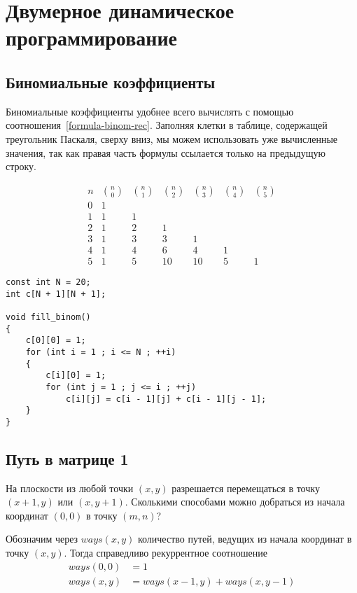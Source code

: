 \documentclass[14pt]{book}
\begin{document}
\section{Двумерное динамическое программирование}

\subsection{Биномиальные коэффициенты}

Биномиальные коэффициенты удобнее всего вычислять с помощью соотношения~\ref{formula-binom-rec}.
Заполняя клетки в таблице, содержащей треугольник Паскаля, сверху вниз, мы можем
использовать уже вычисленные значения, так как правая часть формулы ссылается только на
предыдущую строку.

$$
 \begin{array}{ccccccc}
 n & \binom{n}{0} & \binom{n}{1} & \binom{n}{2} & \binom{n}{3} & \binom{n}{4} & \binom{n}{5} \\
 0 & 1 \\
 1 & 1 & 1 \\
 2 &  1 & 2 & 1 \\
 3 & 1 & 3 & 3 & 1 \\
 4 & 1 & 4 & 6 & 4 & 1 \\
 5 & 1 & 5 & 10 & 10 & 5 & 1
 \end{array}
$$

\begin{lstlisting}
const int N = 20;
int c[N + 1][N + 1];

void fill_binom()
{
    c[0][0] = 1;
    for (int i = 1 ; i <= N ; ++i)
    {
        c[i][0] = 1;
        for (int j = 1 ; j <= i ; ++j)
            c[i][j] = c[i - 1][j] + c[i - 1][j - 1];
    }
}
\end{lstlisting}

\subsection{Путь в матрице 1}

На плоскости из любой точки $(x, y)$ разрешается перемещаться в точку $(x+1,y)$ или $(x,y+1)$.
Сколькими способами можно добраться из начала координат $(0,0)$ в точку $(m,n)$?

Обозначим через $ways(x,y)$ количество путей, ведущих из начала координат в точку $(x,y)$.
Тогда справедливо рекуррентное соотношение
\begin{align*}
ways(0,0) &= 1 \\
ways(x,y) &= ways(x-1,y) + ways(x,y-1)
\end{align*}
\end{document}
